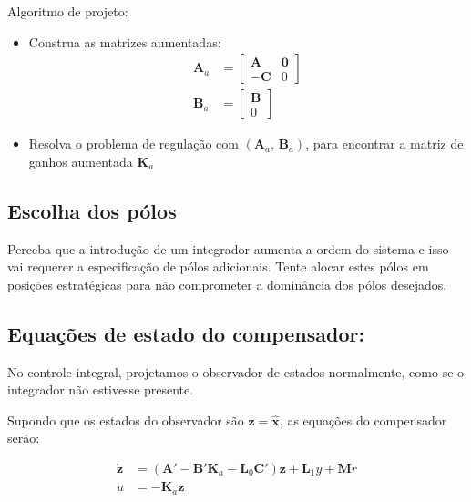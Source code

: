 \documentclass[
]{book}
\begin{document}
Algoritmo de projeto:

\begin{itemize}
\item
  Construa as matrizes aumentadas: \[
  \begin{align*}
  \mathbf{A}_a &= \left[\begin{array}{cc}\mathbf{A} & \mathbf{0}\\-\mathbf{C} & 0\end{array}\right]\\
  \mathbf{B}_a &=\left[\begin{array}{c}\mathbf{B}\\ 0\end{array}\right]
  \end{align*}
  \]
\item
  Resolva o problema de regulação com
  \((\mathbf{A}_a, \, \mathbf{B}_a)\), para encontrar a matriz de ganhos
  aumentada \(\mathbf{K}_a\)
\end{itemize}

\hypertarget{escolha-dos-puxf3los-1}{%
\subsection{Escolha dos pólos}\label{escolha-dos-puxf3los-1}}

Perceba que a introdução de um integrador aumenta a ordem do sistema e
isso vai requerer a especificação de pólos adicionais. Tente alocar
estes pólos em posições estratégicas para não comprometer a dominância
dos pólos desejados.

\hypertarget{equauxe7uxf5es-de-estado-do-compensador}{%
\subsection{Equações de estado do compensador:}\label{equauxe7uxf5es-de-estado-do-compensador}}

No controle integral, projetamos o observador de estados normalmente,
como se o integrador não estivesse presente.

Supondo que os estados do observador são \(\mathbf{z}=\hat{\mathbf{x}}\),
as equações do compensador serão:

\[ 
\begin{align*}
    \dot{\mathbf{z}}&= (\mathbf{A}'-\mathbf{B}'\mathbf{K}_a-\mathbf{L}_0\mathbf{C}')\mathbf{z}+\mathbf{L}_1y+\mathbf{M}r\\
    u &= \mathbf{-K}_a\mathbf{z}
\end{align*}
\]
\end{document}
